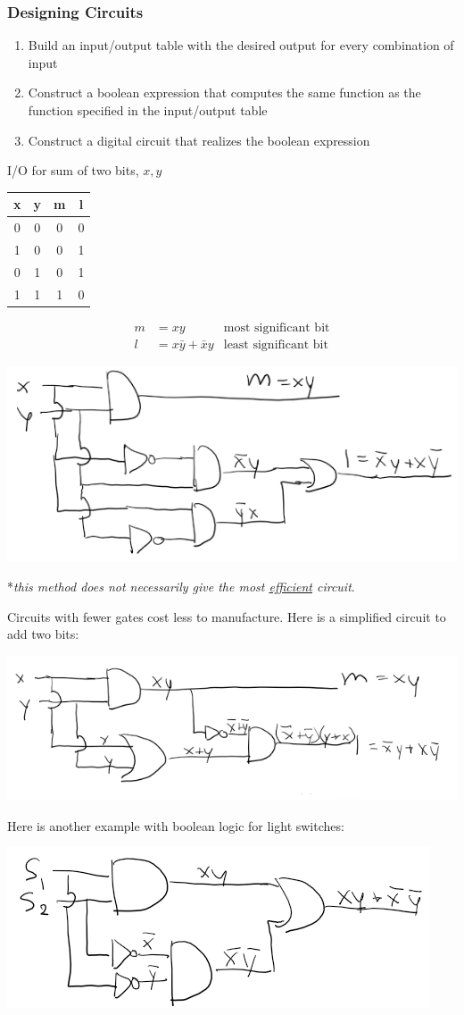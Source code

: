 \subsubsection{Designing Circuits}

\begin{enumerate}
  \item Build an input/output table with the desired output for every combination of input
  \item Construct a boolean expression that computes the same function as the function specified in the input/output table
  \item Construct a digital circuit that realizes the boolean expression
\end{enumerate}

I/O for sum of two bits, $x,y$
\begin{center}
  \begin{tabular}{cccc}
    x & y & m & l \\
    \hline
    0 & 0 & 0 & 0 \\
    1 & 0 & 0 & 1 \\
    0 & 1 & 0 & 1 \\
    1 & 1 & 1 & 0 \\
  \end{tabular}
\end{center}
\begin{align*}
  m & = xy                  & \text{most significant bit}  \\
  l & = x\bar{y} + \bar{x}y & \text{least significant bit}
\end{align*}
\begin{center}
  \includegraphics[width=.6\linewidth]{resources/sum_of_two_bits.png}
\end{center}
\begin{center}
  *\textit{this method does not necessarily give the most \underline{efficient} circuit}.
\end{center}
Circuits with fewer gates cost less to manufacture. Here is a simplified circuit to add two bits:
\begin{center}
  \includegraphics[width=.6\linewidth]{resources/better_sum_of_two_bits.png}
\end{center}

Here is another example with boolean logic for light switches:
\begin{center}
  \includegraphics[width=.6\linewidth]{resources/switches.png}
\end{center}
